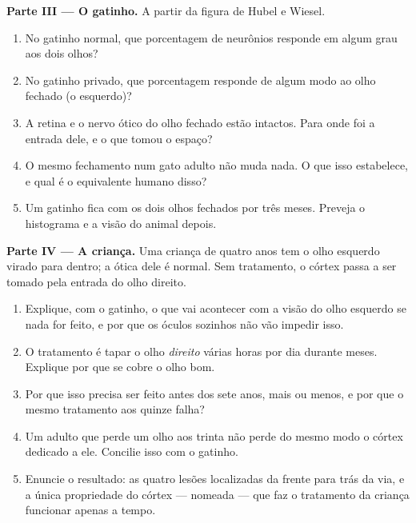 \begin{problem}
\medskip
\noindent\textbf{Parte III --- O gatinho.}
A partir da figura de Hubel e Wiesel.
\begin{enumerate}[resume]
  \item No gatinho normal, que porcentagem de neurônios responde em
        algum grau aos dois olhos?
  \item No gatinho privado, que porcentagem responde de algum modo ao
        olho fechado (o esquerdo)?
  \item A retina e o nervo ótico do olho fechado estão intactos. Para
        onde foi a entrada dele, e o que tomou o espaço?
  \item O mesmo fechamento num gato adulto não muda nada. O que isso
        estabelece, e qual é o equivalente humano disso?
  \item Um gatinho fica com os dois olhos fechados por três meses.
        Preveja o histograma e a visão do animal depois.
\end{enumerate}

\medskip
\noindent\textbf{Parte IV --- A criança.}
Uma criança de quatro anos tem o olho esquerdo virado para dentro; a
ótica dele é normal. Sem tratamento, o córtex passa a ser tomado pela
entrada do olho direito.
\begin{enumerate}[resume]
  \item Explique, com o gatinho, o que vai acontecer com a visão do
        olho esquerdo se nada for feito, e por que os óculos sozinhos
        não vão impedir isso.
  \item O tratamento é tapar o olho \emph{direito} várias horas por
        dia durante meses. Explique por que se cobre o olho bom.
  \item Por que isso precisa ser feito antes dos sete anos, mais ou
        menos, e por que o mesmo tratamento aos quinze falha?
  \item Um adulto que perde um olho aos trinta não perde do mesmo modo
        o córtex dedicado a ele. Concilie isso com o gatinho.
  \item Enuncie o resultado: as quatro lesões localizadas da frente
        para trás da via, e a única propriedade do córtex --- nomeada
        --- que faz o tratamento da criança funcionar apenas a tempo.
\end{enumerate}
\end{problem}
